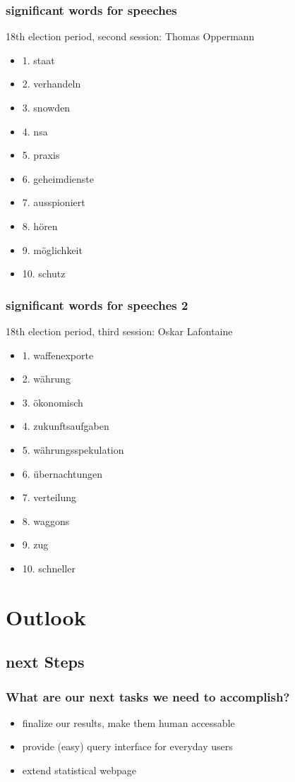 \documentclass[11pt, a4paper]{beamer}
\begin{document}
\begin{frame}
\frametitle{significant words for speeches}
18th election period, second session: Thomas Oppermann
\begin{itemize}
\item 1. staat
\item 2. verhandeln
\item 3. snowden
\item 4. nsa
\item 5. praxis
\item 6. geheimdienste
\item 7. ausspioniert
\item 8. hören
\item 9. möglichkeit
\item 10. schutz
\end{itemize}
\end{frame}

\begin{frame}
\frametitle{significant words for speeches 2}
18th election period, third session: Oskar Lafontaine
\begin{itemize}
\item 1. waffenexporte
\item 2. währung
\item 3. ökonomisch
\item 4. zukunftsaufgaben
\item 5. währungsspekulation
\item 6. übernachtungen
\item 7. verteilung
\item 8. waggons
\item 9. zug
\item 10. schneller
\end{itemize}
\end{frame}

\section{Outlook}

\subsection{next Steps}
\begin{frame}
\frametitle{What are our next tasks we need to accomplish?}
\begin{itemize}
	\item finalize our results, make them human accessable
	\item provide (easy) query interface for everyday users
	\item extend statistical webpage
\end{itemize}
\end{frame}
\end{document}
